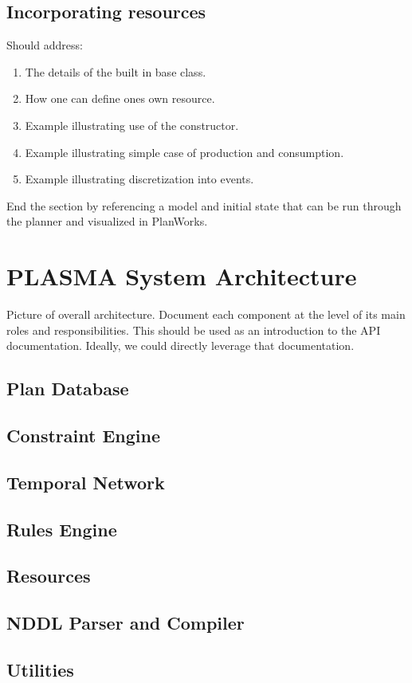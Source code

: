\documentclass[10pt, letterpaper, twoside]{article}
\begin{document}
\subsection{Incorporating resources}
Should address:
\begin{enumerate}
\item The details of the built in base class. 
\item How one can define ones own resource. 
\item Example illustrating use of the constructor.
\item Example illustrating simple case of production and consumption.
\item Example illustrating discretization into events.
\end{enumerate}

End the section by referencing a model and initial state that can be run through the planner and visualized in PlanWorks.

\section{PLASMA System Architecture}
Picture of overall architecture. Document each component at the level of its main roles and responsibilities. This should be used as an introduction to the API documentation. Ideally, we could directly leverage that documentation.
\subsection{Plan Database}
\subsection{Constraint Engine}
\subsection{Temporal Network}
\subsection{Rules Engine}
\subsection{Resources}
\subsection{NDDL Parser and Compiler}
\subsection{Utilities}
\end{document}
